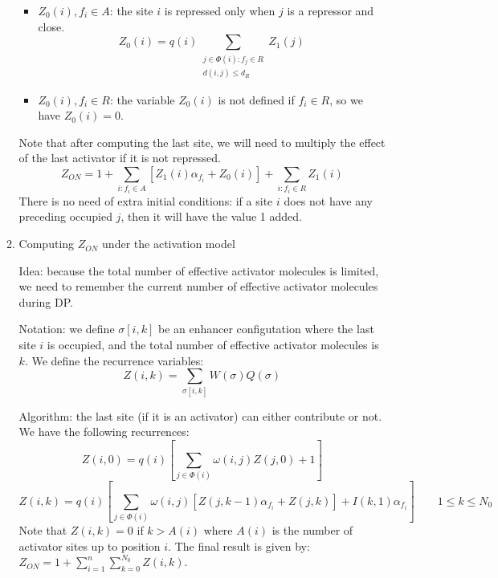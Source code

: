 \documentclass[11pt]{article}
\begin{document}
\begin{enumerate}
\begin{enumerate}
\begin{itemize}
\item $Z_0(i), f_i \in A$: the site $i$ is repressed only when $j$ is a repressor and close. 
\begin{equation}
Z_0(i) = q(i)  \sum_{\substack{j \in \Phi (i):f_j \in R\\d(i,j) \leq d_R}} Z_1(j) 
\end{equation}

\item $Z_0(i), f_i \in R$: the variable $Z_0(i)$ is not defined if $f_i \in R$, so we have $Z_0(i) = 0$. 

\end{itemize}
Note that after computing the last site, we will need to multiply the effect of the last activator if it is not repressed. 
\begin{equation}
Z_{ON} = 1 + \sum_{i:f_i \in A} \left[ Z_1(i) \alpha_{f_i} + Z_0(i) \right] + \sum_{i:f_i \in R} Z_1(i)
\end{equation}
There is no need of extra initial conditions: if a site $i$ does not have any preceding occupied $j$, then it will have the value 1 added. 

\item{Computing $Z_{ON}$ under the activation model} 

Idea: because the total number of effective activator molecules is limited, we need to remember the current number of effective activator molecules during DP. 

Notation: we define $\sigma[i,k]$ be an enhancer configutation where the last site $i$ is occupied, and the total number of effective activator molecules is $k$. We define the recurrence variables: 
\begin{equation}
Z(i,k) = \sum_{\sigma[i,k]} W(\sigma) Q(\sigma)
\end{equation}

Algorithm: the last site (if it is an activator) can either contribute or not. We have the following recurrences:
\begin{equation}
Z(i,0) = q(i) \left[ \sum_{j \in \Phi (i)} \omega(i,j) Z(j,0) + 1 \right]
\end{equation}
\begin{equation}
Z(i,k) = q(i) \left[ \sum_{j \in \Phi (i)} \omega(i,j) [Z(j,k-1) \alpha_{f_i} + Z(j,k) ]+ I(k,1)\alpha_{f_i} \right] \qquad 1 \leq k \leq N_0
\end{equation}
Note that $Z(i,k) = 0$ if $k > A(i)$ where $A(i)$ is the number of activator sites up to position $i$. The final result is given by: $Z_{ON} = 1 + \sum_{i=1}^{n} \sum_{k=0}^{N_0}Z(i,k)$. 


\end{enumerate}
\end{enumerate}
\end{document}
